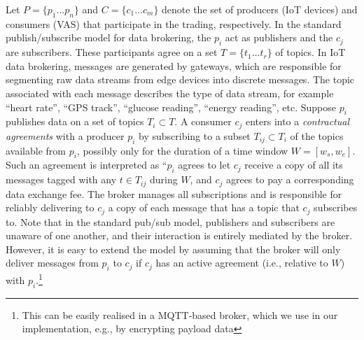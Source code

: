 \documentclass[chi_draft]{sigchi}
\begin{document}
Let  $P = \{p_1 \dots p_n \}$ and $C = \{ c_1 \dots c_m \}$ denote the set of producers (IoT devices) and consumers (VAS) that participate in the trading, respectively.
%
In the standard publish/subscribe model for data brokering, the $p_i$ act as publishers and the $c_j$ are subscribers.
These participants agree on a set $T = \{ t_1 \dots t_r \}$ of topics.
In IoT data brokering, messages are generated by gateways, which are responsible for segmenting raw data streams from edge devices into discrete messages.
The topic associated with each message describes the type of data stream, for example ``heart rate'', ``GPS track'', ``glucose reading'', ``energy reading'', etc.
%
Suppose $ p_i $ publishes data on a set of topics $T_{i} \subset T$.
A consumer $ c_j  $ enters into a \textit{contractual agreements} with a producer $ p_i  $ by subscribing to a subset $T_{ij} \subset T_i$ of the topics available from $p_i$, possibly only for the duration of a time window $ W = [w_s, w_e] $.
Such an agreement is interpreted as ``$p_i$ agrees to let $c_j$ receive a copy of all its messages tagged with any $t \in T_{ij}$ during $W$, and $c_j$ agrees to pay a corresponding data exchange fee. 
The broker manages all subscriptions and is responsible for reliably delivering to $ c_j  $ a copy of each message that has a topic that $ c_j $ subscribes to.
%
Note that in the standard pub/sub model, publishers and subscribers are unaware of one another, and their interaction is entirely mediated by the broker. 
However, it is easy to extend the model by assuming that the broker will only deliver messages from $ p_i $ to $ c_j $ if $ c_j $ has an active agreement (i.e., relative to $W$) with $ p_i $.\footnote{This can be easily realised in a MQTT-based broker, which we use in our implementation, e.g., by encrypting payload data}

%	
%
\end{document}
